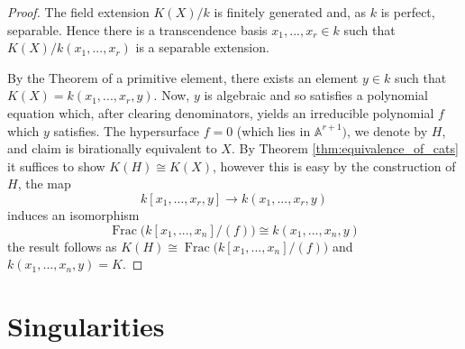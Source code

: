 \documentclass[12pt]{article}
\theoremstyle{plain}
\theoremstyle{definition}
\newcommand{\bb}[1]{\mathbb{#1}}
\newcommand{\lto}{\longrightarrow}
\begin{document}
\begin{proof}
The field extension $K(X)/k$ is finitely generated and, as $k$ is perfect, separable. Hence there is a transcendence basis $x_1,...,x_r \in k$ such that $K(X)/k(x_1,...,x_r)$ is a separable extension.

By the Theorem of a primitive element, there exists an element $y \in k$ such that $K(X) = k(x_1,...,x_r,y)$. Now, $y$ is algebraic and so satisfies a polynomial equation which, after clearing denominators, yields an irreducible polynomial $f$ which $y$ satisfies. The hypersurface $f = 0$ (which lies in $\bb{A}^{r+1})$, we denote by $H$, and claim is birationally equivalent to $X$. By Theorem \ref{thm:equivalence_of_cats} it suffices to show $K(H) \cong K(X)$, however this is easy by the construction of $H$, the map
\begin{equation}
k[x_1,...,x_r,y] \lto k(x_1,...,x_r,y)
\end{equation}
induces an isomorphism
\begin{equation}
\operatorname{Frac}\big(k[x_1,...,x_n]/(f)\big) \cong k(x_1,...,x_n,y)
\end{equation}
the result follows as $K(H) \cong \operatorname{Frac}\big(k[x_1,...,x_n]/(f)\big)$ and $k(x_1,...,x_n,y) = K$.
\end{proof}
%
%
%
%
%
%







\section{Singularities}
\end{document}
